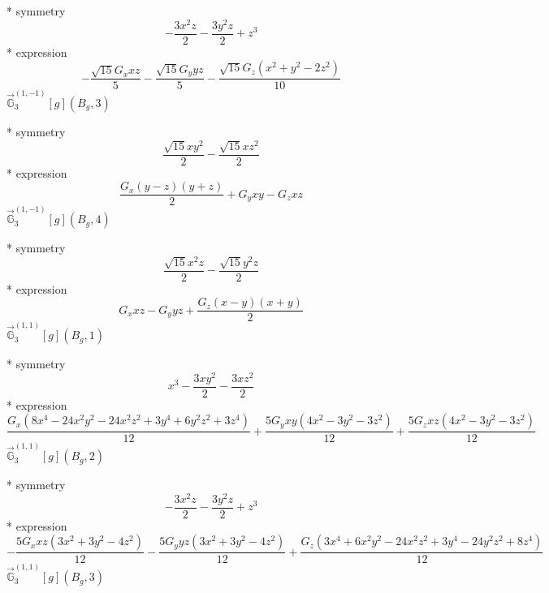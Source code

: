 \documentclass[fleqn,8pt]{jsarticle}
\begin{document}
\noindent\quad ** symmetry
\begin{dmath*}
- \frac{3 x^{2} z}{2} - \frac{3 y^{2} z}{2} + z^{3}
\end{dmath*}
\noindent\quad ** expression
\begin{dmath*}
- \frac{\sqrt{15} G_{x} x z}{5} - \frac{\sqrt{15} G_{y} y z}{5} - \frac{\sqrt{15} G_{z} \left(x^{2} + y^{2} - 2 z^{2}\right)}{10}
\end{dmath*}
\noindent\quad $\vec{\mathbb{G}}_{3}^{(1,-1)}[g](B_{g},3)$

\noindent\quad ** symmetry
\begin{dmath*}
\frac{\sqrt{15} x y^{2}}{2} - \frac{\sqrt{15} x z^{2}}{2}
\end{dmath*}
\noindent\quad ** expression
\begin{dmath*}
\frac{G_{x} \left(y - z\right) \left(y + z\right)}{2} + G_{y} x y - G_{z} x z
\end{dmath*}
\noindent\quad $\vec{\mathbb{G}}_{3}^{(1,-1)}[g](B_{g},4)$

\noindent\quad ** symmetry
\begin{dmath*}
\frac{\sqrt{15} x^{2} z}{2} - \frac{\sqrt{15} y^{2} z}{2}
\end{dmath*}
\noindent\quad ** expression
\begin{dmath*}
G_{x} x z - G_{y} y z + \frac{G_{z} \left(x - y\right) \left(x + y\right)}{2}
\end{dmath*}
\noindent\quad $\vec{\mathbb{G}}_{3}^{(1,1)}[g](B_{g},1)$

\noindent\quad ** symmetry
\begin{dmath*}
x^{3} - \frac{3 x y^{2}}{2} - \frac{3 x z^{2}}{2}
\end{dmath*}
\noindent\quad ** expression
\begin{dmath*}
\frac{G_{x} \left(8 x^{4} - 24 x^{2} y^{2} - 24 x^{2} z^{2} + 3 y^{4} + 6 y^{2} z^{2} + 3 z^{4}\right)}{12} + \frac{5 G_{y} x y \left(4 x^{2} - 3 y^{2} - 3 z^{2}\right)}{12} + \frac{5 G_{z} x z \left(4 x^{2} - 3 y^{2} - 3 z^{2}\right)}{12}
\end{dmath*}
\noindent\quad $\vec{\mathbb{G}}_{3}^{(1,1)}[g](B_{g},2)$

\noindent\quad ** symmetry
\begin{dmath*}
- \frac{3 x^{2} z}{2} - \frac{3 y^{2} z}{2} + z^{3}
\end{dmath*}
\noindent\quad ** expression
\begin{dmath*}
- \frac{5 G_{x} x z \left(3 x^{2} + 3 y^{2} - 4 z^{2}\right)}{12} - \frac{5 G_{y} y z \left(3 x^{2} + 3 y^{2} - 4 z^{2}\right)}{12} + \frac{G_{z} \left(3 x^{4} + 6 x^{2} y^{2} - 24 x^{2} z^{2} + 3 y^{4} - 24 y^{2} z^{2} + 8 z^{4}\right)}{12}
\end{dmath*}
\noindent\quad $\vec{\mathbb{G}}_{3}^{(1,1)}[g](B_{g},3)$
\end{document}
